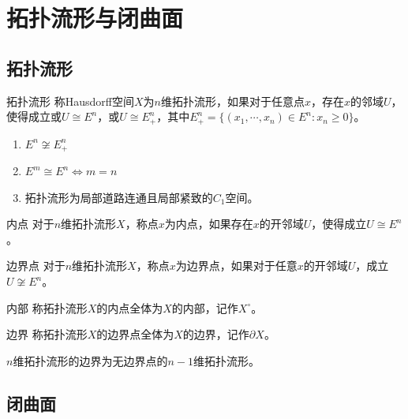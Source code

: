 \documentclass[lang = cn, scheme = chinese, thmcnt = section, usesamecnt]{elegantbook}
\begin{document}
\section{拓扑流形与闭曲面}

\subsection{拓扑流形}

\begin{definition}{拓扑流形}
	称Hausdorff空间$X$为$n$维拓扑流形，如果对于任意点$x$，存在$x$的邻域$U$，使得成立或$U\cong E^n$，或$U\cong E^n_+$，其中$E^n_+=\{ (x_1,\cdots,x_n)\in E^n:x_n\ge 0 \}$。
\end{definition}

\begin{remark}
	\begin{enumerate}
		\item $E^n\not\cong E^n_+$
		\item $E^m\cong E^n\iff m=n$
		\item 拓扑流形为局部道路连通且局部紧致的$C_1$空间。
	\end{enumerate}
\end{remark}

\begin{definition}{内点}
	对于$n$维拓扑流形$X$，称点$x$为内点，如果存在$x$的开邻域$U$，使得成立$U\cong E^n$。
\end{definition}

\begin{definition}{边界点}
	对于$n$维拓扑流形$X$，称点$x$为边界点，如果对于任意$x$的开邻域$U$，成立$U\not\cong E^n$。
\end{definition}

\begin{definition}{内部}
	称拓扑流形$X$的内点全体为$X$的内部，记作$X^\circ$。
\end{definition}

\begin{definition}{边界}
	称拓扑流形$X$的边界点全体为$X$的边界，记作$\partial X$。
\end{definition}

\begin{proposition}
	$n$维拓扑流形的边界为无边界点的$n-1$维拓扑流形。
\end{proposition}

\subsection{闭曲面}
\end{document}
